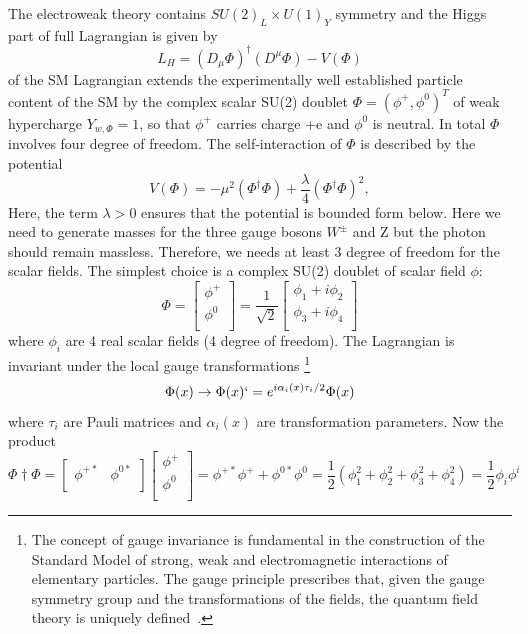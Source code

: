 The electroweak theory contains $SU(2)_L \times U(1)_Y$ symmetry and the Higgs part of full Lagrangian is given by
\begin{equation}
    L_H=(D_{\mu}\Phi)^{\dagger}(D^{\mu}\Phi)-V(\Phi)
\end{equation}
of the SM Lagrangian extends the experimentally well established particle content of the SM by the complex scalar SU(2) doublet $\Phi = (\phi^{+},\phi^0)^T$ of weak hypercharge $Y_{w,\Phi}=1$, so that $\phi^{+}$ carries charge +e and $\phi^0$ is neutral. In total $\Phi$ involves four degree of freedom. The self-interaction of $\Phi$ is described by the potential
\begin{equation}
    V(\Phi)=-\mu^2(\Phi^{\dagger}\Phi)+\frac{\lambda}{4}(\Phi^{\dagger}\Phi)^2,
\end{equation}
Here, the term $\lambda > 0$ ensures that the potential is bounded form below. Here we need to generate masses for the three gauge bosons $W^{\pm}$ and Z but the photon should remain massless. Therefore, we needs at least 3 degree of freedom for the scalar fields. The simplest choice is a complex SU(2) doublet of scalar field $\phi$:
\begin{equation}\label{mat2}
    \Phi=
        \begin{bmatrix}
        \phi^+  \\
        \phi^0  \\
        \end{bmatrix}
    =\frac{1}{\sqrt{2}}
        \begin{bmatrix}
        \phi_1 + i\phi_2    \\
        \phi_3 + i\phi_4    \\
        \end{bmatrix}
\end{equation}
where $\phi_i$ are 4 real scalar fields (4 degree of freedom). The Lagrangian is invariant under the local gauge transformations \footnote{The concept of gauge invariance is fundamental in the construction of the Standard Model of strong, weak and electromagnetic interactions of elementary particles. The gauge principle prescribes that, given the gauge symmetry group and the transformations of the fields, the quantum field theory is uniquely defined~\cite{Coughlan2006}.}
\begin{equation}
    \Phi (x) \rightarrow \Phi(x)`=e^{i\alpha_i(x)\tau_i /2}\Phi(x)
\end{equation}
where $\tau_i$ are Pauli matrices and $\alpha_i(x)$ are transformation parameters.
Now the product
\begin{equation}\label{eq:mat1}
    \Phi{\dagger}\Phi=
        \begin{bmatrix}
        \phi^{+*}   &   \phi^{0*} \\
        \end{bmatrix}
        \begin{bmatrix}
        \phi^+  \\
        \phi^0  \\
        \end{bmatrix}
    =\phi^{+*} \phi^+ + \phi^{0*}\phi^0
    =\frac{1}{2}(\phi^2_1+\phi^2_2+\phi^2_3+\phi^2_4)
    =\frac{1}{2}\phi_i \phi^i
\end{equation}
    
